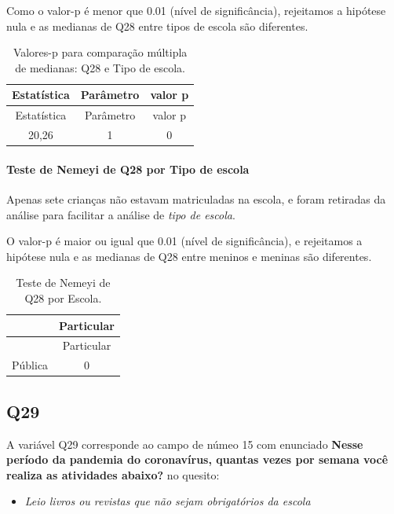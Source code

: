 \documentclass[]{article}
\providecommand{\tightlist}{%
  \setlength{\itemsep}{0pt}\setlength{\parskip}{0pt}}
\let\oldparagraph\paragraph
\renewcommand{\paragraph}[1]{\oldparagraph{#1}\mbox{}}
\begin{document}
Como o valor-p é menor que 0.01 (nível de significância), rejeitamos a hipótese nula e as medianas de Q28 entre tipos de escola são diferentes.

\begin{longtable}[]{@{}ccc@{}}
\caption{\label{tab:unnamed-chunk-885}Valores-p para comparação múltipla de medianas: Q28 e Tipo de escola.}\tabularnewline
\toprule
Estatística & Parâmetro & valor p\tabularnewline
\midrule
\endfirsthead
\toprule
Estatística & Parâmetro & valor p\tabularnewline
\midrule
\endhead
20,26 & 1 & 0\tabularnewline
\bottomrule
\end{longtable}

\hypertarget{teste-de-nemeyi-de-q28-por-tipo-de-escola}{%
\paragraph{Teste de Nemeyi de Q28 por Tipo de escola}\label{teste-de-nemeyi-de-q28-por-tipo-de-escola}}

Apenas sete crianças não estavam matriculadas na escola, e foram retiradas da análise para facilitar a análise de \emph{tipo de escola}.

O valor-p é maior ou igual que 0.01 (nível de significância), e rejeitamos a hipótese nula e as medianas de Q28 entre meninos e meninas são diferentes.

\begin{longtable}[]{@{}lc@{}}
\caption{\label{tab:unnamed-chunk-887}Teste de Nemeyi de Q28 por Escola.}\tabularnewline
\toprule
& Particular\tabularnewline
\midrule
\endfirsthead
\toprule
& Particular\tabularnewline
\midrule
\endhead
Pública & 0\tabularnewline
\bottomrule
\end{longtable}

\cleardoublepage

\hypertarget{q29}{%
\subsection{Q29}\label{q29}}

A variável Q29 corresponde ao campo de númeo 15 com enunciado \textbf{Nesse período da pandemia do coronavírus, quantas vezes por semana você realiza as atividades abaixo?} no quesito:

\begin{itemize}
\tightlist
\item
  \emph{Leio livros ou revistas que não sejam obrigatórios da escola}
\end{itemize}
\end{document}

